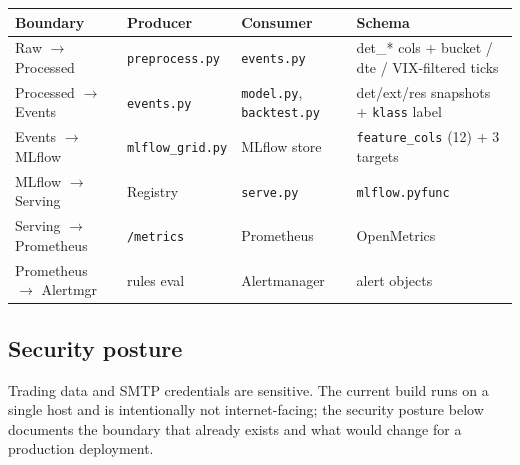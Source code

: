 \documentclass[11pt,a4paper]{article}
\begin{document}
\begin{tabularx}{\linewidth}{@{}llXX@{}}
\toprule
\textbf{Boundary} & \textbf{Producer} & \textbf{Consumer} & \textbf{Schema} \\
\midrule
Raw $\to$ Processed         & \texttt{preprocess.py}                 & \texttt{events.py}                       & det\_* cols + bucket / dte / VIX-filtered ticks \\
Processed $\to$ Events      & \texttt{events.py}                     & \texttt{model.py}, \texttt{backtest.py}  & det/ext/res snapshots + \texttt{klass} label \\
Events $\to$ MLflow         & \texttt{mlflow\_grid.py}               & MLflow store                             & \texttt{feature\_cols} (12) + 3 targets \\
MLflow $\to$ Serving        & Registry                               & \texttt{serve.py}                        & \texttt{mlflow.pyfunc} \\
Serving $\to$ Prometheus    & \texttt{/metrics}                      & Prometheus                               & OpenMetrics \\
Prometheus $\to$ Alertmgr   & rules eval                             & Alertmanager                             & alert objects \\
\bottomrule
\end{tabularx}

\subsection{Security posture}\label{sec:security}
Trading data and SMTP credentials are sensitive. The current build runs on a single host and is intentionally not internet-facing; the security posture below documents the boundary that already exists and what would change for a production deployment.
\end{document}
